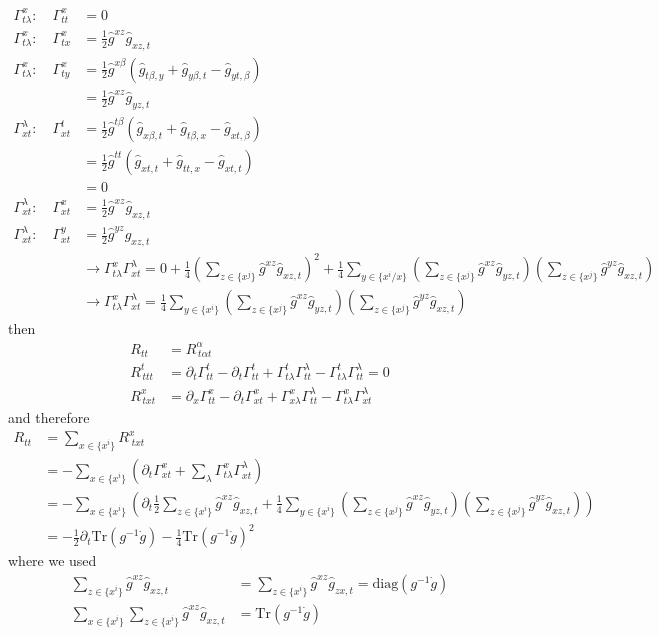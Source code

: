 \documentclass[../main.tex]{subfiles}
\begin{document}
\begin{align}
\Gamma^x_{t\lambda}:\quad\Gamma^x_{tt}&=0\\
\Gamma^x_{t\lambda}:\quad\Gamma^x_{tx}
&=\frac{1}{2}\hat{g}^{xz}\hat{g}_{xz,t}\\
\Gamma^x_{t\lambda}:\quad\Gamma^x_{ty}
&=\frac{1}{2}\hat{g}^{x\beta}(\hat{g}_{t\beta,y}+\hat{g}_{y\beta,t}-\hat{g}_{yt,\beta})\\
&=\frac{1}{2}\hat{g}^{xz}\hat{g}_{yz,t}\\
\Gamma^\lambda_{xt}:\quad\Gamma^t_{xt}&=\frac{1}{2}\hat{g}^{t\beta}(\hat{g}_{x\beta,t}+\hat{g}_{t\beta,x}-\hat{g}_{xt,\beta})\\
&=\frac{1}{2}\hat{g}^{tt}(\hat{g}_{xt,t}+\hat{g}_{tt,x}-\hat{g}_{xt,t})\\
&=0\\
\Gamma^\lambda_{xt}:\quad\Gamma^x_{xt}&=\frac{1}{2}\hat{g}^{xz}\hat{g}_{xz,t}\\
\Gamma^\lambda_{xt}:\quad\Gamma^y_{xt}&=\frac{1}{2}\hat{g}^{yz}\hat{g}_{xz,t}\\
&\rightarrow \Gamma^x_{t\lambda}\Gamma^\lambda_{xt}=0+\frac{1}{4}\left(\sum_{z\in\{x^j\}}\hat{g}^{xz}\hat{g}_{xz,t}\right)^2+\frac{1}{4}\sum_{y\in\{x^i/x\}}\left(\sum_{z\in\{x^j\}}\hat{g}^{xz}\hat{g}_{yz,t}\right)\left(\sum_{z\in\{x^j\}}\hat{g}^{yz}\hat{g}_{xz,t}\right)\\
&\rightarrow \Gamma^x_{t\lambda}\Gamma^\lambda_{xt}=\frac{1}{4}\sum_{y\in\{x^i\}}\left(\sum_{z\in\{x^j\}}\hat{g}^{xz}\hat{g}_{yz,t}\right)\left(\sum_{z\in\{x^j\}}\hat{g}^{yz}\hat{g}_{xz,t}\right)
\end{align}
then
\begin{align}
R_{tt}&=R^\alpha_{\,t\alpha t}\\
R^t_{\,ttt}&=\partial_t\Gamma^t_{tt}-\partial_t\Gamma^t_{tt}+\Gamma^t_{t\lambda}\Gamma^\lambda_{tt}-\Gamma^t_{t\lambda}\Gamma^\lambda_{tt}=0\\
R^x_{\,txt}&=\partial_x\Gamma^x_{tt}-\partial_t\Gamma^x_{xt}+\Gamma^x_{x\lambda}\Gamma^\lambda_{tt}-\Gamma^x_{t\lambda}\Gamma^\lambda_{xt}
\end{align}
and therefore
\begin{align}
R_{tt}
&=\sum_{x\in\{x^i\}}R^x_{\;txt}\\
&=-\sum_{x\in\{x^i\}}\left(\partial_t\Gamma^x_{xt}
+\sum_\lambda\Gamma^x_{t\lambda}\Gamma^\lambda_{xt}\right)\\
&=-\sum_{x\in\{x^i\}}\left(\partial_t
\frac{1}{2}\sum_{z\in\{x^i\}}\hat{g}^{xz}\hat{g}_{xz,t}+\frac{1}{4}\sum_{y\in\{x^i\}}\left(\sum_{z\in\{x^j\}}\hat{g}^{xz}\hat{g}_{yz,t}\right)\left(\sum_{z\in\{x^j\}}\hat{g}^{yz}\hat{g}_{xz,t}\right)\right)\\
&=-\frac{1}{2}\partial_t\text{Tr}(g^{-1}\dot{g})-\frac{1}{4}\text{Tr}(g^{-1}\dot{g})^2
\end{align}
where we used
\begin{align}
\sum_{z\in\{x^i\}}\hat{g}^{xz}\hat{g}_{xz,t}
&=\sum_{z\in\{x^i\}}\hat{g}^{xz}\hat{g}_{zx,t}=\text{diag}(g^{-1}\dot{g})\\
\sum_{x\in\{x^i\}}\sum_{z\in\{x^i\}}\hat{g}^{xz}\hat{g}_{xz,t}
&=\text{Tr}(g^{-1}\dot{g})
\end{align}
\end{document}
